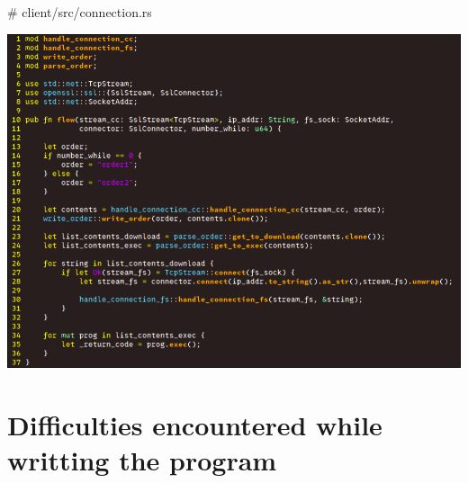 \documentclass[../main.tex]{subfiles}
\begin{document}
    \# client/src/connection.rs

    \includegraphics[width=450pt]{client_flow.png}

	\vspace{10pt}

	\section{Difficulties encountered while writting the program}
\end{document}
